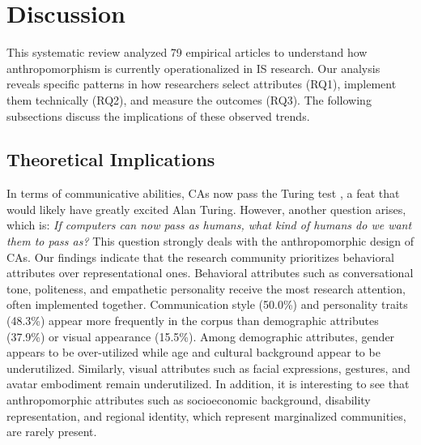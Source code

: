 \documentclass[manuscript,anonymous,sigconf]{acmart}
\begin{document}
\section{Discussion} \label{discussion}

This systematic review analyzed 79 empirical articles to understand how anthropomorphism is currently operationalized in IS research. Our analysis reveals specific patterns in how researchers select attributes (RQ1), implement them technically (RQ2), and measure the outcomes (RQ3). The following subsections discuss the implications of these observed trends.

\subsection{Theoretical Implications}


In terms of communicative abilities, CAs now pass the Turing test \citep{jones_large_2025}, a feat that would likely have greatly excited Alan Turing. However, another question arises, which is: \textit{If computers can now pass as humans, what kind of humans do we want them to pass as?} This question strongly deals with the anthropomorphic design of CAs. Our findings indicate that the research community prioritizes behavioral attributes over representational ones. Behavioral attributes such as conversational tone, politeness, and empathetic personality receive the most research attention, often implemented together. Communication style (50.0\%) and personality traits (48.3\%) appear more frequently in the corpus than demographic attributes (37.9\%) or visual appearance (15.5\%). Among demographic attributes, gender appears to be over-utilized while age and cultural background appear to be underutilized. Similarly, visual attributes such as facial expressions, gestures, and avatar embodiment remain underutilized. In addition, it is interesting to see that anthropomorphic attributes such as socioeconomic background, disability representation, and regional identity, which represent marginalized communities, are rarely present. 
\end{document}
